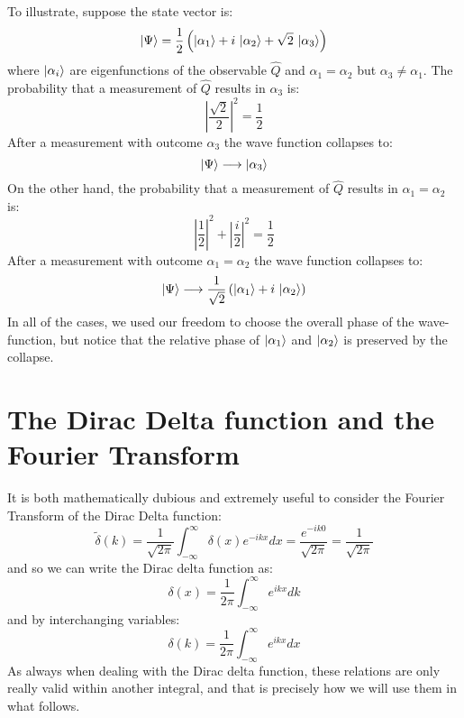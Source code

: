 \documentclass[12pt]{book}
\begin{document}
To illustrate, suppose the state vector is: 
$$\ket{\Psi} = \frac{1}{2}\left(\ket{\alpha_1} + i\,\ket{\alpha_2} + \sqrt{2}\,\ket{\alpha_3}\right)$$
where $\ket{\alpha_i}$ are eigenfunctions of the observable $\hat{Q}$ and $\alpha_1 = \alpha_2$ but $\alpha_3 \neq \alpha_1$.
The probability that a measurement of $\hat{Q}$ results in $\alpha_3$ is:
$$\left|\frac{\sqrt{2}}{2}\right|^2 = \frac{1}{2}$$
After a measurement with outcome $\alpha_3$ the wave function collapses to:
$$\ket{\Psi} \longrightarrow \ket{\alpha_3}$$
On the other hand, the probability that a measurement of $\hat{Q}$ results in $\alpha_1 = \alpha_2$ is:
$$\left|\frac{1}{2}\right|^2 + \left|\frac{i}{2}\right|^2 = \frac{1}{2}$$
After a measurement with outcome $\alpha_1=\alpha_2$ the wave function collapses to:
$$\ket{\Psi} \longrightarrow \frac{1}{\sqrt{2}}\left(\ket{\alpha_1} + i\,\ket{\alpha_2}\right)$$
In all of the cases, we used our freedom to choose the overall phase of the wave-function, but notice that the relative phase of $\ket{\alpha_1}$ and $\ket{\alpha_2}$ is preserved by the collapse.

\section{The Dirac Delta function and the Fourier Transform}

It is both mathematically dubious and extremely useful to consider the Fourier Transform of the Dirac Delta function:
$$
\widetilde{\delta}(k) = \frac{1}{\sqrt{2\pi}} \int_{-\infty}^{\infty} \delta(x) e^{-ikx} dx  = \frac{e^{-ik0}}{\sqrt{2\pi}} = \frac{1}{\sqrt{2\pi}} 
$$
and so we can write the Dirac delta function as:
\begin{equation}
\label{eqn:fourierdelta}
\delta(x) = \frac{1}{2\pi} \int_{-\infty}^{\infty} e^{ikx} dk
\end{equation}
and by interchanging variables:
\begin{equation*}
\delta(k) = \frac{1}{2\pi} \int_{-\infty}^{\infty} e^{ikx} dx
\end{equation*}
As always when dealing with the Dirac delta function, these relations are only really valid within another integral, and that is precisely how we will use them in what follows.
\end{document}
